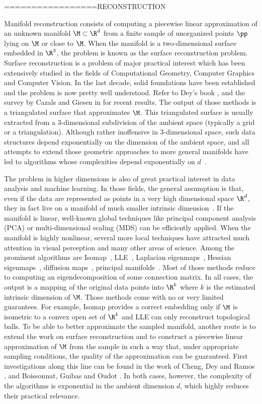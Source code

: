 =================RECONSTRUCTION

Manifold reconstruction consists of computing a piecewise linear
approximation of an unknown manifold $\M \subset \R^d$ from a finite
sample of unorganized points $\pp$ lying on $\M$ or close to
$\M$. When the manifold is a two-dimensional surface embedded in
$\R^3$, the problem is known as the surface reconstruction
problem. Surface reconstruction is a problem of major practical
interest which has been extensively studied in the fields of
Computational Geometry, Computer Graphics and Computer Vision.  In the
last decade, solid foundations have been established and the problem
is now pretty well understood. Refer to Dey's book \cite{bookdey}, and
the survey by Cazals and Giesen in \cite{book1} for recent
results. The output of those methods is a triangulated surface that
approximates $\M$. This triangulated surface is usually extracted from
a 3-dimensional subdivision of the ambient space (typically a grid or
a triangulation). Although rather inoffensive in 3-dimensional space,
such data structures depend exponentially on the dimension of the
ambient space, and all attempts to extend those geometric approaches
to more general manifolds have led to algorithms whose complexities
depend exponentially on
$d$~\cite{manifold3, manifold4,manifold2,homology1}.

The problem in higher dimensions is also of great practical interest
in data analysis and machine learning. In those fields, the general
assumption is that, even if the data are represented as points in a
very high dimensional space $\R^d$, they in fact live on a manifold of
much smaller intrinsic dimension~\cite{seung-lee}. If the manifold is
linear, well-known global techniques like principal component analysis
(PCA) or multi-dimensional scaling (MDS) can be efficiently
applied. When the manifold is highly nonlinear, several more local
techniques have attracted much attention in visual perception and many
other areas of science. Among the prominent algorithms are
Isomap~\cite{isomap}, LLE~\cite{lle}, Laplacian
eigenmaps~\cite{laplacian}, Hessian eigenmaps~\cite{hessian},
diffusion maps~\cite{diffusion,diffusion1}, principal
manifolds~\cite{principal-manifolds}. Most of those methods reduce to
computing an eigendecomposition of some connection matrix. In all
cases, the output is a mapping of the original data points into $\R^k$
where $k$ is the estimated intrinsic dimension of $\M$.  Those methods
come with no or very limited guarantees. For example, Isomap provides
a correct embedding only if $\M$ is isometric to a convex open set of
$\R ^k$ and LLE can only reconstruct topological balls. To be able to
better approximate the sampled manifold, another route is to extend
the work on surface reconstruction and to construct a piecewise linear
approximation of $\M$ from the sample in such a way that, under
appropriate sampling conditions, the quality of the approximation can
be guaranteed. First investigations along this line can be found in
the work of Cheng, Dey and Ramos \cite{manifold2}, and Boissonnat,
Guibas and Oudot \cite{manifold3}. In both cases, however, the
complexity of the algorithms is exponential in the ambient dimension
$d$, which highly reduces their practical relevance.

